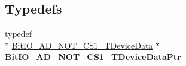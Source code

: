 \subsection*{Typedefs}
\begin{DoxyCompactItemize}
\item 
\hypertarget{group___bit_i_o___a_d___n_o_t___c_s1__module_ga1a593c78a9255f5f887d24d63cde3216}{typedef \\*
\hyperlink{struct_bit_i_o___a_d___n_o_t___c_s1___t_device_data}{Bit\-I\-O\-\_\-\-A\-D\-\_\-\-N\-O\-T\-\_\-\-C\-S1\-\_\-\-T\-Device\-Data} $\ast$ {\bfseries Bit\-I\-O\-\_\-\-A\-D\-\_\-\-N\-O\-T\-\_\-\-C\-S1\-\_\-\-T\-Device\-Data\-Ptr}}\label{group___bit_i_o___a_d___n_o_t___c_s1__module_ga1a593c78a9255f5f887d24d63cde3216}

\end{DoxyCompactItemize}
